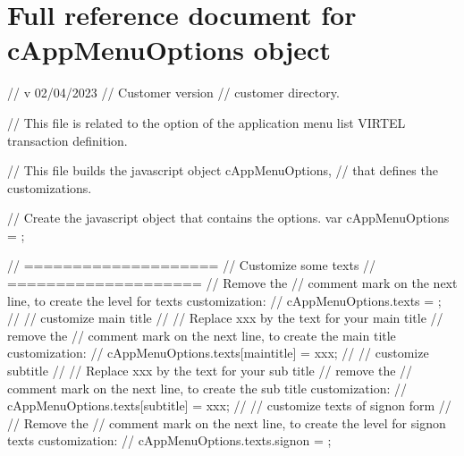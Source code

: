 \documentclass[letterpaper,10pt,english]{sphinxmanual}
\begin{document}
\section{Full reference document for cAppMenuOptions object}
\label{\detokenize{Customization:full-reference-document-for-cappmenuoptions-object}}
\begin{sphinxVerbatim}[commandchars=\\\{\}]
// v 02/04/2023
// Customer version
// customer directory.

// This file is related to the option of the application menu list VIRTEL transaction definition.


// This file builds the javascript object cAppMenuOptions,
// that defines the customizations.

// Create the javascript object that contains the options.
var cAppMenuOptions = \PYGZob{}\PYGZcb{};

// ====================
// Customize some texts
// ====================
// Remove the // comment mark on the next line, to create the level for texts customization:
// cAppMenuOptions.texts = \PYGZob{}\PYGZcb{};
//
// customize main title
// \PYGZhy{}\PYGZhy{}\PYGZhy{}\PYGZhy{}\PYGZhy{}\PYGZhy{}\PYGZhy{}\PYGZhy{}\PYGZhy{}\PYGZhy{}\PYGZhy{}\PYGZhy{}\PYGZhy{}\PYGZhy{}\PYGZhy{}\PYGZhy{}\PYGZhy{}\PYGZhy{}\PYGZhy{}\PYGZhy{}
// Replace xxx by the text for your main title
// remove the // comment mark on the next line, to create the main title customization:
// cAppMenuOptions.texts[\PYGZdq{}main\PYGZhy{}title\PYGZdq{}] = \PYGZdq{}xxx\PYGZdq{};
//
// customize subtitle
// \PYGZhy{}\PYGZhy{}\PYGZhy{}\PYGZhy{}\PYGZhy{}\PYGZhy{}\PYGZhy{}\PYGZhy{}\PYGZhy{}\PYGZhy{}\PYGZhy{}\PYGZhy{}\PYGZhy{}\PYGZhy{}\PYGZhy{}\PYGZhy{}\PYGZhy{}\PYGZhy{}
// Replace xxx by the text for your sub title
// remove the // comment mark on the next line, to create the sub title customization:
// cAppMenuOptions.texts[\PYGZdq{}sub\PYGZhy{}title\PYGZdq{}] = \PYGZdq{}xxx\PYGZdq{};
//
// customize texts of signon form
// \PYGZhy{}\PYGZhy{}\PYGZhy{}\PYGZhy{}\PYGZhy{}\PYGZhy{}\PYGZhy{}\PYGZhy{}\PYGZhy{}\PYGZhy{}\PYGZhy{}\PYGZhy{}\PYGZhy{}\PYGZhy{}\PYGZhy{}\PYGZhy{}\PYGZhy{}\PYGZhy{}\PYGZhy{}\PYGZhy{}\PYGZhy{}\PYGZhy{}\PYGZhy{}\PYGZhy{}\PYGZhy{}\PYGZhy{}\PYGZhy{}\PYGZhy{}\PYGZhy{}\PYGZhy{}
// Remove the // comment mark on the next line, to create the level for signon texts customization:
// cAppMenuOptions.texts.signon = \PYGZob{}\PYGZcb{};


\end{sphinxVerbatim}
\end{document}
